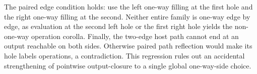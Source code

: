 The paired edge condition holds: use the left one-way filling at the first
hole and the right one-way filling at the second. Neither entire family is
one-way edge by edge, as evaluation at the second left hole or the first
right hole yields the non-one-way operation corolla. Finally, the two-edge
host path cannot end at an output reachable on both sides. Otherwise paired
path reflection would make its hole labels operations, a contradiction.
This regression rules out an accidental strengthening of pointwise
output-closure to a single global one-way-side choice.

